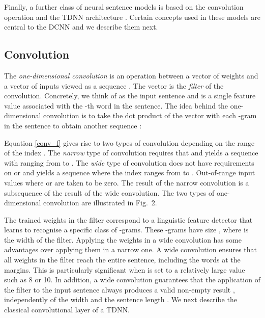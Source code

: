 \documentclass[11pt]{article}
\begin{document}
Finally, a further class of neural sentence models is based on the convolution operation and the TDNN architecture \cite{collobert:2008,KalchbrennerBlunsom2013:RCNN}. Certain concepts used in these models are central to the DCNN and we describe them next.



\subsection{Convolution}
\label{conv_types_sect}
The \emph{one-dimensional convolution} is an operation between a vector of weights  and a vector of inputs viewed as a sequence . The vector  is the \emph{filter} of the convolution. Concretely, we think of  as the input sentence and  is a single feature value associated with the -th word in the sentence. The idea behind the one-dimensional convolution is to take the dot product of the vector  with each -gram in the sentence  to obtain another sequence :

\vspace{-7pt}
 

\vspace{-2pt}
\noindent
Equation \ref{conv_f} gives rise to two types of convolution depending on the range of the index . The \emph{narrow} type of convolution requires that  and yields a sequence  with  ranging from  to . The \emph{wide} type of convolution does not have requirements on  or  and yields a sequence  where the index  ranges from  to .  Out-of-range input values  where  or  are taken to be zero. The result of the narrow convolution is a subsequence of the result of the wide convolution. The two types of one-dimensional convolution are illustrated in Fig.~2.

The trained weights in the filter  correspond to a linguistic feature detector that learns to recognise a specific class of -grams. These -grams have size , where  is the width of the filter. Applying the weights  in a wide convolution has some advantages over applying them in a narrow one. A wide convolution ensures that all weights in the filter reach the entire sentence, including the words at the margins. This is particularly significant when  is set to a relatively large value such as 8 or 10. In addition, a wide convolution guarantees that the application of the filter  to the input sentence  always produces a valid non-empty result , independently of the width  and the sentence length . We next describe the classical convolutional layer of a TDNN.
\end{document}
